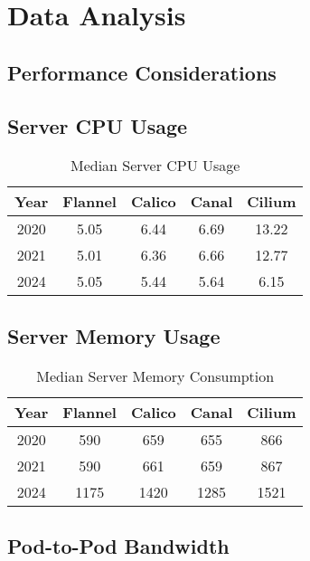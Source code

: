 %
%

\pagebreak
\section{Data Analysis}

\onehalfspacing

\subsection{Performance Considerations}

\subsection{Server CPU Usage}

\begin{table}[H]
\caption{Median Server CPU Usage}
\begin{tabular}{|c | c | c | c | c|} 
 \hline
 Year & Flannel & Calico & Canal & Cilium \\
 \hline\hline
 2020 & 5.05 & 6.44 & 6.69 & 13.22 \\ 
 \hline
 2021 & 5.01 & 6.36 & 6.66 & 12.77 \\
 \hline
 2024 & 5.05 & 5.44 & 5.64 & 6.15 \\
 \hline
\end{tabular}
\label{tab:cpu}
\end{table}

\subsection{Server Memory Usage}

\begin{table}[H]
\caption{Median Server Memory Consumption}
\begin{tabular}{|c | c | c | c | c|} 
 \hline
 Year & Flannel & Calico & Canal & Cilium \\
 \hline\hline
 2020 & 590 & 659 & 655 & 866 \\ 
 \hline
 2021 & 590 & 661 & 659 & 867 \\
 \hline
 2024 & 1175 & 1420 & 1285 & 1521 \\
 \hline
\end{tabular}
\label{tab:mem}
\end{table}

\subsection{Pod-to-Pod Bandwidth}

